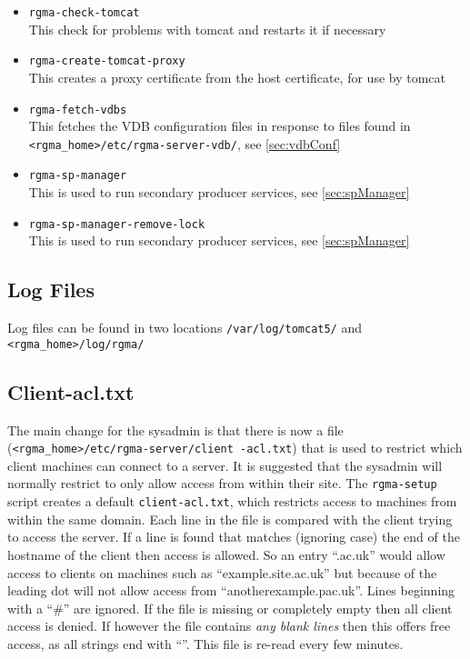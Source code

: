 \begin{itemize}
\item\texttt{rgma-check-tomcat}\\
This check for problems with tomcat and restarts it if necessary

\item\texttt{rgma-create-tomcat-proxy}\\
This creates a proxy certificate from the host certificate, for use by
tomcat

\item\texttt{rgma-fetch-vdbs}\\
This fetches the VDB configuration files in response to files found in\\
\verb!<rgma_home>!\texttt{/etc/rgma-server-vdb/}, see \ref{sec:vdbConf}

\item\texttt{rgma-sp-manager}\\
This is used to run secondary producer services, see \ref{sec:spManager}

\item\texttt{rgma-sp-manager-remove-lock}\\
This is used to run secondary producer services, see \ref{sec:spManager}
\end{itemize}

\subsection{Log Files}
Log files can be found in two locations \texttt{/var/log/tomcat5/} and
\verb!<rgma_home>!\texttt{/log/rgma/}

\subsection{Client-acl.txt}
The main change for the sysadmin is that there is now a file
(\verb!<rgma_home>!\texttt{/etc/rgma-server/client{} -acl.txt}) that
is used to restrict which client machines can connect to a server. It
is suggested that the sysadmin will normally restrict to only allow
access from within their site. The \texttt{rgma-setup} script creates
a default \texttt{client{}-acl.txt}, which restricts access to
machines from within the same domain. Each line in the file is
compared with the client trying to access the server. If a line is
found that matches (ignoring case) the end of the hostname of the
client then access is allowed. So an entry ``.ac.uk'' would allow
access to clients on machines such as ``example.site.ac.uk'' but
because of the leading dot will not allow access from
``anotherexample.pac.uk''. Lines beginning with a ``\#'' are
ignored. If the file is missing or completely empty then all client
access is denied. If however the file contains \textit{any blank
  lines} then this offers free access, as all strings end with
``''. This file is re{}-read every few minutes.


